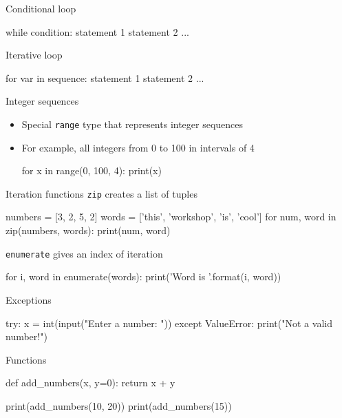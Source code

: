 \documentclass[noamssymb,svgnames]{beamer}
\begin{document}
\begin{frame}[fragile]{Conditional loop}
  \begin{python}
      while condition:
          statement 1
          statement 2
          ...
  \end{python}
\end{frame}

\begin{frame}[fragile]{Iterative loop}
  \begin{python}
      for var in sequence:
          statement 1
          statement 2
          ...
  \end{python}
\end{frame}

\begin{frame}[fragile]{Integer sequences}
  \begin{itemize}
  \item Special \texttt{range} type that represents integer sequences
  \item For example, all integers from 0 to 100 in intervals of 4
    \begin{python}
        for x in range(0, 100, 4):
            print(x)
    \end{python}
  \end{itemize}
\end{frame}

\begin{frame}[fragile]{Iteration functions}
  \texttt{zip} creates a list of tuples
  \begin{python}
    numbers = [3, 2, 5, 2]
    words = ['this', 'workshop', 'is', 'cool']
    for num, word in zip(numbers, words):
        print(num, word)
  \end{python}
  \vfill
  \texttt{enumerate} gives an index of iteration
  \begin{python}
    for i, word in enumerate(words):
        print('Word {} is {}'.format(i, word))
  \end{python}
\end{frame}

\begin{frame}[fragile]{Exceptions}
  \begin{python}
      try:
          x = int(input("Enter a number: "))
      except ValueError:
          print("Not a valid number!")
  \end{python}
\end{frame}

\begin{frame}[fragile]{Functions}
  \begin{python}
      def add_numbers(x, y=0):
          return x + y

      print(add_numbers(10, 20))
      print(add_numbers(15))
  \end{python}
\end{frame}
\end{document}
